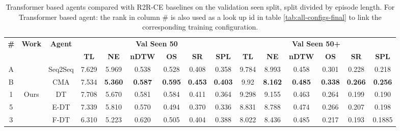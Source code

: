 \begin{table}
\centering
\caption{\label{tab:best_seen_50}Transformer based agents compared with R2R-CE baselines on the validation seen split, split divided by episode length. For Transformer based agent: the rank in column \# is also used as a look up id in table \ref{tab:all-configs-final} to link the corresponding training configuration.}
\begin{tabular}{@{\hskip3pt}c@{\hskip3pt}c@{\hskip3pt}c@{\hskip3pt}c@{\hskip3pt}c@{\hskip3pt}c@{\hskip3pt}c@{\hskip3pt}c@{\hskip3pt}c@{\hskip3pt}c@{\hskip3pt}c@{\hskip3pt}c@{\hskip3pt}c@{\hskip3pt}c@{\hskip3pt}c}
\toprule
\textbf{\#} & \textbf{Work} & \textbf{Agent} & \multicolumn{6}{c}{\textbf{Val Seen 50}} & \multicolumn{6}{c}{\textbf{Val Seen 50+}} \\
\cmidrule(l){4-9}\cmidrule(l){10-15}\textbf{~} &     \textbf{~} &                \textbf{~} &       \textbf{TL} &    \textbf{NE} &   \textbf{nDTW} &     \textbf{OS} &    \textbf{SR} &    \textbf{SPL} &         \textbf{TL} &     \textbf{NE} &   \textbf{nDTW} &     \textbf{OS} &    \textbf{SR} &    \textbf{SPL} \\
\midrule
          A &             \citet{VLNCE}  &                  Seq2Seq &             7.629 &          5.969 &           0.538 &   0.528 &   0.408 &           0.358 &                9.784 &           8.993 &           0.458 &  0.301 &  0.228 &  0.218 \\
          B &            &  CMA &             7.534 &          \textbf{5.360} &           \textbf{0.587} &           \textbf{0.595} &          \textbf{0.453} &           \textbf{0.403} &               9.92 &           \textbf{8.162} &           \textbf{0.485} &           \textbf{0.338} &          \textbf{0.266} &           \textbf{0.256} \\
\midrule
          1 &            Ours  &                  DT &             7.708&          5.670 &           0.581 &   0.584 &  0.411 &           0.364 &                9.298 &     9.155      &    0.463       &  0.264 & 0.199  &  0.190 \\
          5 &            &  E-DT &             7.339 &          5.810 &           0.570 &           0.494 &       0.370    &       0.336     &              8.831 &           8.788 &           0.474 &           0.266 &          0.207 &           0.198 \\
          3 &            &  F-DT &              6.310 &  5.223 &  0.620 &        0.505    &        0.404   &    0.388 &               8.022 &  8.436 &  0.485 &       0.217      &          0.193 &           0.1885 \\
\bottomrule
\end{tabular}
\end{table}
